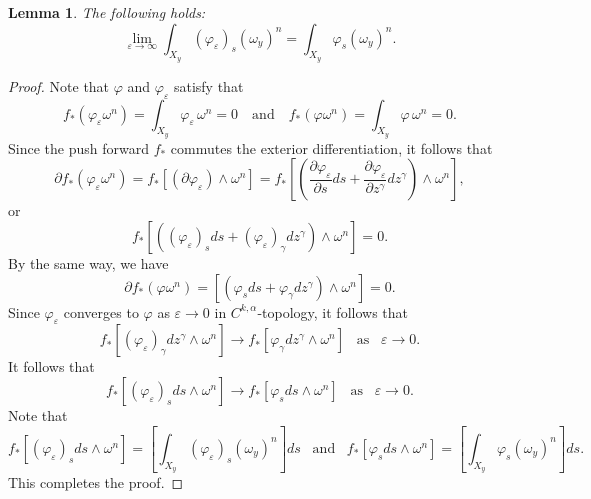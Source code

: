 \documentclass{amsart}
\newtheorem{lemma}[theorem]{Lemma}
\theoremstyle{definition}
\numberwithin{equation}{section}
\begin{document}
\begin{lemma} \label{L:bdry1}
The following holds:
\begin{equation*}
\lim_{{\varepsilon}\rightarrow\infty}
\int_{X_y}({\varphi}_{\varepsilon})_s(\omega_y)^n
=
\int_{X_y}{\varphi}_s(\omega_y)^n.
\end{equation*}
\end{lemma}

\begin{proof}
Note that ${\varphi}$ and ${\varphi}_{\varepsilon}$ satisfy that
\begin{equation*}
f_*({\varphi}_{\varepsilon}\omega^n)
=
\int_{X_y}{\varphi}_{\varepsilon}\,\omega^n
=0
\quad\text{and}\quad
f_*({\varphi}\omega^n)
=
\int_{X_y}{\varphi}\,\omega^n
=0.
\end{equation*}
Since the push forward $f_*$ commutes the exterior differentiation, it follows that
\begin{equation*}
\partial f_*({\varphi}_{\varepsilon}\omega^n)
=
f_*{\left[{(\partial{\varphi}_{\varepsilon})\wedge\omega^n}\right]}
=
f_*
{\left[{
	{\left({{\frac{\partial{{\varphi}_{\varepsilon}}}{\partial{s}}}ds+{\frac{\partial{{\varphi}_{\varepsilon}}}{\partial{z^\gamma}}}dz^\gamma
	}\right)}\wedge\omega^n
}\right]},
\end{equation*}
or
\begin{equation*}
f_*
{\left[{
	{\left({({\varphi}_{\varepsilon})_sds+({\varphi}_{\varepsilon})_\gamma dz^\gamma
	}\right)}\wedge\omega^n
}\right]}
=0.
\end{equation*}
By the same way, we have
\begin{equation*}
\partial f_*({\varphi}\omega^n)
=
{\left[{
	{\left({{\varphi}_sds+{\varphi}_\gamma dz^\gamma
	}\right)}\wedge\omega^n
}\right]}=0.
\end{equation*}
Since ${\varphi}_{\varepsilon}$ converges to ${\varphi}$ as ${\varepsilon}\rightarrow0$ in $C^{k,\alpha}$-topology, it follows that
\begin{equation*}
f_*
{\left[{({\varphi}_{\varepsilon})_\gamma dz^\gamma\wedge\omega^n
}\right]}
\rightarrow
f_*
{\left[{{\varphi}_\gamma dz^\gamma\wedge\omega^n
}\right]}
\;\;\;
\text{as}
\;\;\;
{\varepsilon}\rightarrow0.
\end{equation*}
It follows that
\begin{equation*}
f_*
{\left[{({\varphi}_{\varepsilon})_s ds\wedge\omega^n
}\right]}
\rightarrow
f_*
{\left[{{\varphi}_s ds\wedge\omega^n
}\right]}
\;\;\;
\text{as}
\;\;\;
{\varepsilon}\rightarrow0.
\end{equation*}
Note that
\begin{equation*}
f_*
{\left[{({\varphi}_{\varepsilon})_s ds\wedge\omega^n
}\right]}
=
{\left[{\int_{X_y}({\varphi}_{\varepsilon})_s(\omega_y)^n
}\right]}
ds
\;\;\;
\text{and}
\;\;\;
f_*
{\left[{{\varphi}_s ds\wedge\omega^n
}\right]}
=
{\left[{\int_{X_y}{\varphi}_s(\omega_y)^n
}\right]}
ds.
\end{equation*}
This completes the proof.
\end{proof}
\end{document}
